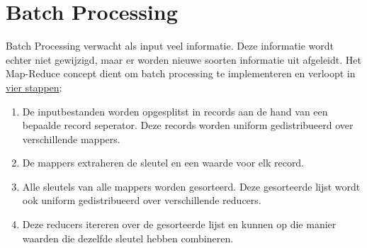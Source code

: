 	\section{Batch Processing}
	Batch Processing verwacht als input veel informatie. Deze informatie wordt echter niet gewijzigd, maar er worden nieuwe soorten informatie uit afgeleidt. Het Map-Reduce concept dient om batch processing te implementeren en verloopt in \underline{vier stappen}:
	\begin{enumerate}
		\item De inputbestanden worden opgesplitst in records aan de hand van een bepaalde record seperator. Deze records worden uniform gedistribueerd over verschillende mappers.
		\item De mappers extraheren de sleutel en een waarde voor elk record. 
		\item Alle sleutels van alle mappers worden gesorteerd. Deze gesorteerde lijst wordt ook uniform gedistribueerd over verschillende reducers.
		\item Deze reducers itereren over de gesorteerde lijst en kunnen op die manier waarden die dezelfde sleutel hebben combineren.
	\end{enumerate}
	



	